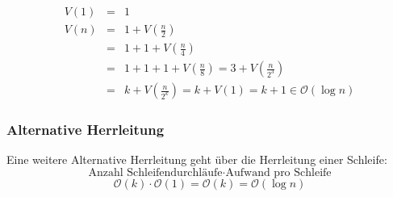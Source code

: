 \begin{eqnarray*}
	V(1) &=& 1 \\
	V(n) &=& 1+ V(\frac{n}{2}) \\
	&=& 1+1+V(\frac{n}{4}) \\
	&=& 1+1+1+V(\frac{n}{8}) = 3 +V(\frac{n}{2^{3}}) \\
	&=& k+V(\frac{n}{2^{k}}) = k+V(1) = k+1 \in \mathcal{O}(\log n)
\end{eqnarray*}

\subsubsection{Alternative Herrleitung}
Eine weitere Alternative Herrleitung geht über die Herrleitung einer Schleife:
\[ \textrm{Anzahl Schleifendurchläufe} \cdot \textrm{Aufwand pro Schleife} \]
\[ \mathcal{O}(k) \cdot \mathcal{O}(1) = \mathcal{O}(k) = \mathcal{O}(\log n) \]

